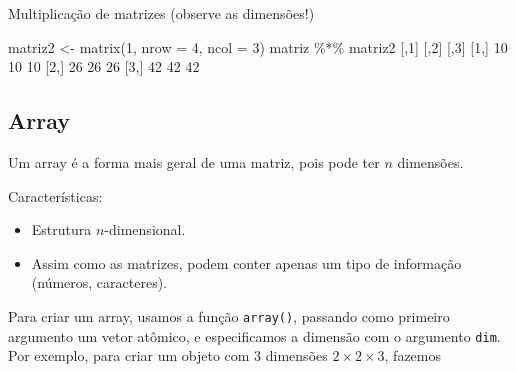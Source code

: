 \documentclass[
  10pt,
  a4paper]{book}
\newenvironment{Shaded}{\begin{snugshade}}{\end{snugshade}}
\newcommand{\AttributeTok}[1]{\textcolor[rgb]{0.77,0.63,0.00}{#1}}
\newcommand{\DecValTok}[1]{\textcolor[rgb]{0.00,0.00,0.81}{#1}}
\newcommand{\FunctionTok}[1]{\textcolor[rgb]{0.00,0.00,0.00}{#1}}
\newcommand{\NormalTok}[1]{#1}
\newcommand{\OtherTok}[1]{\textcolor[rgb]{0.56,0.35,0.01}{#1}}
\newcommand{\SpecialCharTok}[1]{\textcolor[rgb]{0.00,0.00,0.00}{#1}}
\providecommand{\tightlist}{%
  \setlength{\itemsep}{0pt}\setlength{\parskip}{0pt}}
\begin{document}
Multiplicação de matrizes (observe as dimensões!)

\begin{Shaded}
\begin{Highlighting}[]
\NormalTok{matriz2 }\OtherTok{\textless{}{-}} \FunctionTok{matrix}\NormalTok{(}\DecValTok{1}\NormalTok{, }\AttributeTok{nrow =} \DecValTok{4}\NormalTok{, }\AttributeTok{ncol =} \DecValTok{3}\NormalTok{)}
\NormalTok{matriz }\SpecialCharTok{\%*\%}\NormalTok{ matriz2}
\NormalTok{     [,}\DecValTok{1}\NormalTok{] [,}\DecValTok{2}\NormalTok{] [,}\DecValTok{3}\NormalTok{]}
\NormalTok{[}\DecValTok{1}\NormalTok{,]   }\DecValTok{10}   \DecValTok{10}   \DecValTok{10}
\NormalTok{[}\DecValTok{2}\NormalTok{,]   }\DecValTok{26}   \DecValTok{26}   \DecValTok{26}
\NormalTok{[}\DecValTok{3}\NormalTok{,]   }\DecValTok{42}   \DecValTok{42}   \DecValTok{42}
\end{Highlighting}
\end{Shaded}

\hypertarget{array}{%
\subsection{Array}\label{array}}

Um array é a forma mais geral de uma matriz, pois pode ter \(n\)
dimensões.

Características:

\begin{itemize}
\tightlist
\item
  Estrutura \(n\)-dimensional.
\item
  Assim como as matrizes, podem conter apenas um tipo de informação
  (números, caracteres).
\end{itemize}

Para criar um array, usamos a função \texttt{array()}, passando como primeiro
argumento um vetor atômico, e especificamos a dimensão com o argumento
\texttt{dim}. Por exemplo, para criar um objeto com 3 dimensões \(2 \times 2 \times 3\), fazemos
\end{document}
